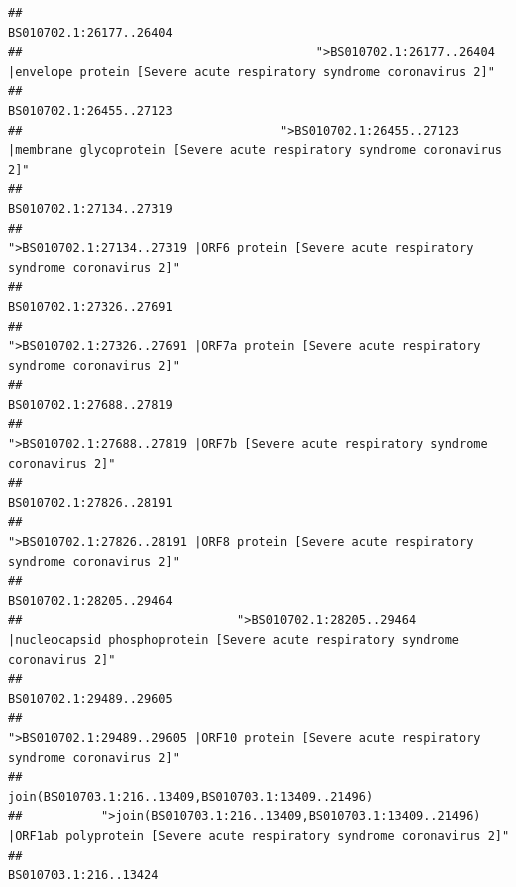 \documentclass[
]{article}
\begin{document}
\begin{verbatim}
##                                                                                                                BS010702.1:26177..26404 
##                                         ">BS010702.1:26177..26404 |envelope protein [Severe acute respiratory syndrome coronavirus 2]" 
##                                                                                                                BS010702.1:26455..27123 
##                                    ">BS010702.1:26455..27123 |membrane glycoprotein [Severe acute respiratory syndrome coronavirus 2]" 
##                                                                                                                BS010702.1:27134..27319 
##                                             ">BS010702.1:27134..27319 |ORF6 protein [Severe acute respiratory syndrome coronavirus 2]" 
##                                                                                                                BS010702.1:27326..27691 
##                                            ">BS010702.1:27326..27691 |ORF7a protein [Severe acute respiratory syndrome coronavirus 2]" 
##                                                                                                                BS010702.1:27688..27819 
##                                                    ">BS010702.1:27688..27819 |ORF7b [Severe acute respiratory syndrome coronavirus 2]" 
##                                                                                                                BS010702.1:27826..28191 
##                                             ">BS010702.1:27826..28191 |ORF8 protein [Severe acute respiratory syndrome coronavirus 2]" 
##                                                                                                                BS010702.1:28205..29464 
##                              ">BS010702.1:28205..29464 |nucleocapsid phosphoprotein [Severe acute respiratory syndrome coronavirus 2]" 
##                                                                                                                BS010702.1:29489..29605 
##                                            ">BS010702.1:29489..29605 |ORF10 protein [Severe acute respiratory syndrome coronavirus 2]" 
##                                                                                    join(BS010703.1:216..13409,BS010703.1:13409..21496) 
##           ">join(BS010703.1:216..13409,BS010703.1:13409..21496) |ORF1ab polyprotein [Severe acute respiratory syndrome coronavirus 2]" 
##                                                                                                                  BS010703.1:216..13424 

\end{verbatim}
\end{document}
